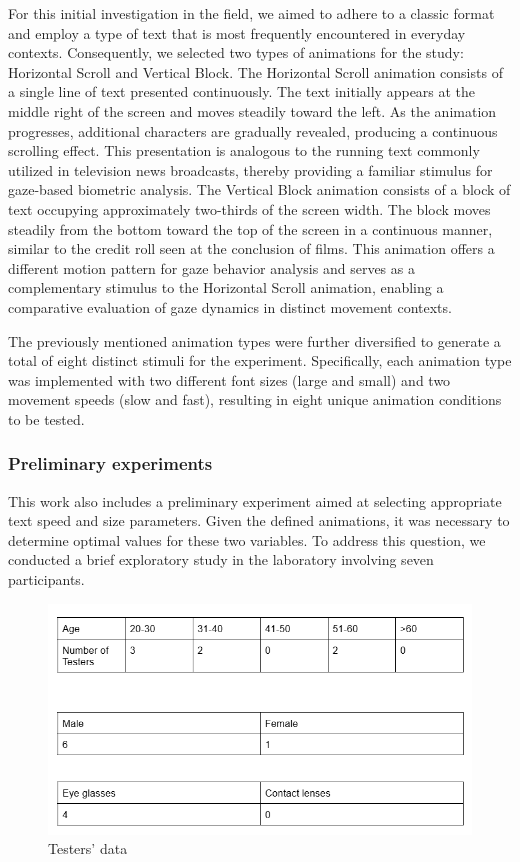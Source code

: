\documentclass{article}
\begin{document}
For this initial investigation in the field, we aimed to adhere to a classic format and employ a type of text that is most frequently encountered in everyday contexts. 
Consequently, we selected two types of animations for the study: Horizontal Scroll and Vertical Block.
The Horizontal Scroll animation consists of a single line of text presented continuously. 
The text initially appears at the middle right of the screen and moves steadily toward the left. 
As the animation progresses, additional characters are gradually revealed, producing a continuous scrolling effect. 
This presentation is analogous to the running text commonly utilized in television news broadcasts, thereby providing a familiar stimulus for gaze-based biometric analysis.
The Vertical Block animation consists of a block of text occupying approximately two-thirds of the screen width. 
The block moves steadily from the bottom toward the top of the screen in a continuous manner, similar to the credit roll seen at the conclusion of films. 
This animation offers a different motion pattern for gaze behavior analysis and serves as a complementary stimulus to the Horizontal Scroll animation, enabling a comparative evaluation of gaze dynamics in distinct movement contexts.

The previously mentioned animation types were further diversified to generate a total of eight distinct stimuli for the experiment. 
Specifically, each animation type was implemented with two different font sizes (large and small) and two movement speeds (slow and fast), resulting in eight unique animation conditions to be tested.

\subsubsection{Preliminary experiments}

This work also includes a preliminary experiment aimed at selecting appropriate text speed and size parameters. 
Given the defined animations, it was necessary to determine optimal values for these two variables. 
To address this question, we conducted a brief exploratory study in the laboratory involving seven participants.

\begin{figure}[ht]
    \centering
    \includegraphics[width = 0.6
    \textwidth]{Images/Experiment/tester_speed.png}
    \caption{Testers' data}
    \label{fig:prel}
\end{figure}
\end{document}
